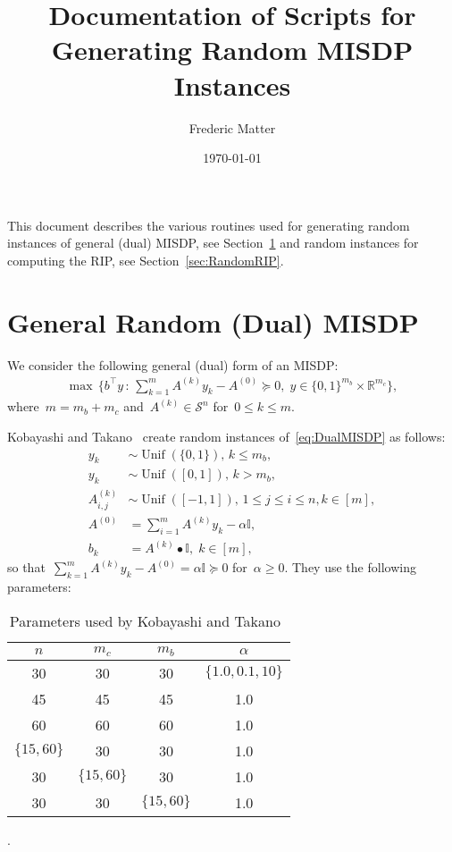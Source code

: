 \documentclass[11pt,a4paper]{article}
\title{Documentation of Scripts for Generating Random MISDP Instances}
\author{Frederic Matter}
\date{\today}
\newcommand{\R}{\mathds{R}}
\newcommand{\sym}{\mathcal{S}}
\newcommand{\suchthat}{\, : \,}
\newcommand{\T}{^\top}
\newcommand{\id}{\mathds{I}} %
\DeclareMathOperator{\unif}{Unif}
\theoremstyle{definition}
\begin{document}
\maketitle

This document describes the various routines used for generating random
instances of general (dual) MISDP, see Section~\ref{sec:RandomMISDP} and
random instances for computing the RIP, see Section~\ref{sec:RandomRIP}.

\section{General Random (Dual) MISDP}
\label{sec:RandomMISDP}
We consider the following general (dual) form of an MISDP:
\begin{align}\label{eq:DualMISDP}
  \max\, \{b\T y \suchthat \sum_{k=1}^m A^{(k)}y_k - A^{(0)} \succeq 0,\; y
  \in \{0,1\}^{m_b} \times \R^{m_c}\},
\end{align}
where~$m = m_b + m_c$ and~$A^{(k)} \in \sym^n$ for~$0\leq k\leq m$.

Kobayashi and Takano~\cite{Kob20} create random instances
of~\eqref{eq:DualMISDP} as follows:
\begin{align*}
  y_k &\sim \unif(\{0,1\}), \, k \leq m_b,\\
  y_k &\sim \unif([0,1]),\, k > m_b, \\
  A^{(k)}_{i,j} &\sim \unif([-1,1]),\, 1\leq j \leq i \leq n, k \in [m],\\
  A^{(0)} &= \sum_{i=1}^m A^{(k)}y_k - \alpha \id,\\
  b_k &= A^{(k)}\bullet \id, \; k \in [m],
\end{align*}
so that~$\sum_{k=1}^m A^{(k)}y_k - A^{(0)} = \alpha\id \succeq 0$
for~$\alpha \geq 0$. They use the following parameters:
\begin{table}[h]
  \centering
  \begin{tabular}{cccc}
    $n$ & $m_c$ & $m_b$ & $\alpha$ \\
    \toprule
    30 & 30 & 30 & $\{1.0,0.1,10\}$ \\
    45 & 45 & 45 & 1.0 \\
    60 & 60 & 60 & 1.0 \\
    $\{15,60\}$ & 30 & 30 & 1.0 \\
    30 & $\{15,60\}$ & 30 & 1.0 \\
    30 & 30 & $\{15,60\}$ & 1.0
  \end{tabular}
  \caption{Parameters used by Kobayashi and Takano~\cite{Kob20}}.
  \label{tab:KTinstanceSizes}
\end{table}
\end{document}
